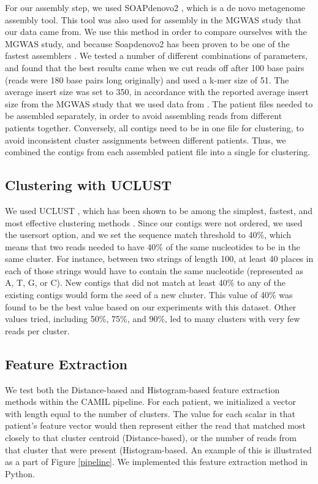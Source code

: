 For our assembly step, we used SOAPdenovo2 \cite{luo12}, which is a de novo metagenome assembly tool. This tool was also used for assembly in the MGWAS study that our data came from. We use this method in order to compare ourselves with the MGWAS study, and because Soapdenovo2 has been proven to be one of the fastest assemblers \cite{peng12}. We tested a number of different combinations of parameters, and found that the best results came when we cut reads off after 100 base pairs (reads were 180 base pairs long originally) and used a k-mer size of 51. The average insert size was set to 350, in accordance with the reported average insert size from the MGWAS study that we used data from \cite{qin041012}. The patient files needed to be assembled separately, in order to avoid assembling reads from different patients together. Conversely, all contigs need to be in one file for clustering, to avoid inconsistent cluster assignments between different patients. Thus, we combined the contigs from each assembled patient file into a single for clustering.

\subsection{Clustering with UCLUST}

We used UCLUST \cite{Edgar10}, which has been shown to be among the simplest, fastest, and most effective clustering methods \cite{bonder090112, sun042711}. Since our contigs were not ordered, we used the usersort option, and we set the sequence match threshold to 40\%, which means that two reads needed to have 40\% of the same nucleotides to be in the same cluster. For instance, between two strings of length 100, at least 40 places in each of those strings would have to contain the same nucleotide (represented as A, T, G, or C). New contigs that did not match at least 40\% to any of the existing contigs would form the seed of a new cluster. This value of 40\% was found to be the best value based on our experiments with this dataset. Other values tried, including 50\%, 75\%, and 90\%, led to many clusters with very few reads per cluster.

\subsection{Feature Extraction}

We test both the Distance-based and Histogram-based feature extraction methods within the CAMIL pipeline. For each patient, we initialized a vector with length equal to the number of clusters. The value for each scalar in that patient's feature vector would then represent either the read that matched most closely to that cluster centroid (Distance-based), or the number of reads from that cluster that were present (Histogram-based. An example of this is illustrated as a part of Figure \ref{pipeline}. We implemented this feature extraction method in Python.

